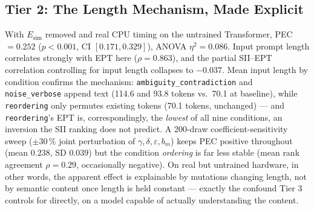 \documentclass[conference]{IEEEtran}
\begin{document}
\subsection{Tier 2: The Length Mechanism, Made Explicit}
\label{sec:results-stage2}
With $E_\text{sim}$ removed and real CPU timing on the untrained
Transformer, PEC $=0.252$ ($p<0.001$, CI $[0.171,0.329]$), ANOVA
$\eta^2=0.086$. Input prompt length correlates strongly with EPT here
($\rho=0.863$), and the partial SII--EPT correlation controlling for
input length collapses to $-0.037$. Mean input length by condition
confirms the mechanism: \texttt{ambiguity\_contradiction} and
\texttt{noise\_verbose} append text (114.6 and 93.8 tokens vs.\ 70.1
at baseline), while \texttt{reordering} only permutes existing tokens
(70.1 tokens, unchanged) --- and \texttt{reordering}'s EPT is,
correspondingly, the \emph{lowest} of all nine conditions, an
inversion the SII ranking does not predict. A 200-draw
coefficient-sensitivity sweep ($\pm30\,\%$ joint perturbation of
$\gamma,\delta,\varepsilon,b_m$) keeps PEC positive throughout (mean
$0.238$, SD $0.039$) but the condition \emph{ordering} is far less
stable (mean rank agreement $\rho=0.29$, occasionally negative). On
real but untrained hardware, in other words, the apparent effect is
explainable by mutations changing length, not by semantic content once
length is held constant --- exactly the confound Tier 3 controls for
directly, on a model capable of actually understanding the content.
\end{document}
